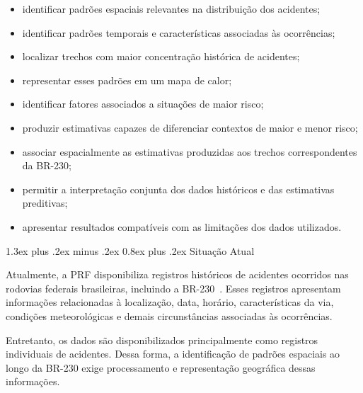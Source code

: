 \documentclass[11pt,a4paper]{article}
\makeatletter
\renewcommand\section{
\@startsection{section}{1}{0pt}%
{1.3ex plus .2ex minus .2ex}%
{0.8ex plus .2ex}%
{\normalfont\Large\bfseries}
}
\makeatother
\begin{document}
\begin{itemize}

    \item identificar padrões espaciais relevantes na distribuição dos acidentes;

    \item identificar padrões temporais e características associadas às ocorrências;

    \item localizar trechos com maior concentração histórica de acidentes;

    \item representar esses padrões em um mapa de calor;

    \item identificar fatores associados a situações de maior risco;

    \item produzir estimativas capazes de diferenciar contextos de maior e menor risco;

    \item associar espacialmente as estimativas produzidas aos trechos correspondentes da BR-230;

    \item permitir a interpretação conjunta dos dados históricos e das estimativas preditivas;

    \item apresentar resultados compatíveis com as limitações dos dados utilizados.

\end{itemize}



\section{Situação Atual}

Atualmente, a PRF disponibiliza registros históricos de acidentes ocorridos nas rodovias federais brasileiras, incluindo a BR-230~\cite{prfdados}. Esses registros apresentam informações relacionadas à localização, data, horário, características da via, condições meteorológicas e demais circunstâncias associadas às ocorrências.

Entretanto, os dados são disponibilizados principalmente como registros individuais de acidentes. Dessa forma, a identificação de padrões espaciais ao longo da BR-230 exige processamento e representação geográfica dessas informações.
\end{document}
